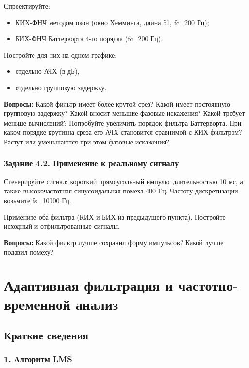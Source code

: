 \documentclass[12pt,a4paper,openany]{book}
\providecommand{\tightlist}{\setlength{\itemsep}{0pt}\setlength{\parskip}{0pt}}
\begin{document}
Спроектируйте:

\begin{itemize}
\tightlist
\item
  КИХ-ФНЧ методом окон (окно Хемминга, длина 51, fc=200 Гц);
\item
  БИХ-ФНЧ Баттерворта 4-го порядка (fc=200 Гц).
\end{itemize}

Постройте для них на одном графике:

\begin{itemize}
\tightlist
\item
  отдельно АЧХ (в дБ),
\item
  отдельно групповую задержку.
\end{itemize}

\textbf{Вопросы:} Какой фильтр имеет более крутой срез? Какой имеет постоянную групповую задержку? Какой вносит меньшие фазовые искажения? Какой требует меньше вычислений? Попробуйте увеличить порядок фильтра Баттерворта. При каком порядке крутизна среза его АЧХ становится сравнимой с КИХ-фильтром? Растут или уменьшаются при этом фазовые искажения?

\subsection*{Задание 4.2. Применение к реальному сигналу}

Сгенерируйте сигнал: короткий прямоугольный импульс длительностью 10 мс, а также высокочастотная синусоидальная помеха 400 Гц. Частоту дискретизации возьмите fs=10000 Гц.

Примените оба фильтра (КИХ и БИХ из предыдущего пункта). Постройте исходный и отфильтрованные сигналы.

\textbf{Вопросы:} Какой фильтр лучше сохранил форму импульсов? Какой лучше подавил помеху?


\chapter{Адаптивная фильтрация и частотно-временной анализ}

\section*{Краткие сведения}

\subsection*{1. Алгоритм LMS}
\end{document}
